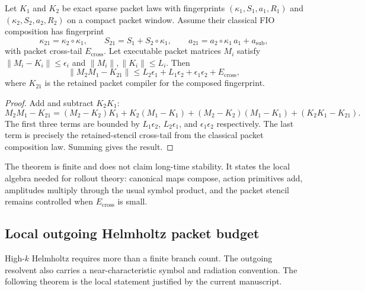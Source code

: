 \begin{theorem}
\label{thm:fingerprint-composition-closure}
Let $K_1$ and $K_2$ be exact sparse packet laws with fingerprints
$(\kappa_1,S_1,a_1,R_1)$ and $(\kappa_2,S_2,a_2,R_2)$ on a compact packet
window.  Assume their classical FIO composition has fingerprint
\[
  \kappa_{21}=\kappa_2\circ\kappa_1,\qquad
  S_{21}=S_1+S_2\circ\kappa_1,\qquad
  a_{21}=a_2\circ\kappa_1\, a_1 + a_{\mathrm{sub}},
\]
with packet cross-tail $E_{\mathrm{cross}}$.  Let executable packet matrices
$M_i$ satisfy $\|M_i-K_i\|\le \epsilon_i$ and $\|M_i\|,\|K_i\|\le L_i$.
Then
\[
\|M_2M_1-K_{21}\|
\le
L_2\epsilon_1+L_1\epsilon_2+\epsilon_1\epsilon_2+E_{\mathrm{cross}},
\]
where $K_{21}$ is the retained packet compiler for the composed fingerprint.
\end{theorem}

\begin{proof}
Add and subtract $K_2K_1$:
\[
M_2M_1-K_{21}
=(M_2-K_2)K_1+K_2(M_1-K_1)+(M_2-K_2)(M_1-K_1)
 +(K_2K_1-K_{21}).
\]
The first three terms are bounded by
$L_1\epsilon_2$, $L_2\epsilon_1$, and $\epsilon_1\epsilon_2$ respectively.
The last term is precisely the retained-stencil cross-tail from the classical
packet composition law.  Summing gives the result.
\end{proof}

The theorem is finite and does not claim long-time stability.  It states the
local algebra needed for rollout theory: canonical maps compose, action
primitives add, amplitudes multiply through the usual symbol product, and the
packet stencil remains controlled when $E_{\mathrm{cross}}$ is small.

\subsection{Local outgoing Helmholtz packet budget}

High-$k$ Helmholtz requires more than a finite branch count.  The outgoing
resolvent also carries a near-characteristic symbol and radiation convention.
The following theorem is the local statement justified by the current
manuscript.

